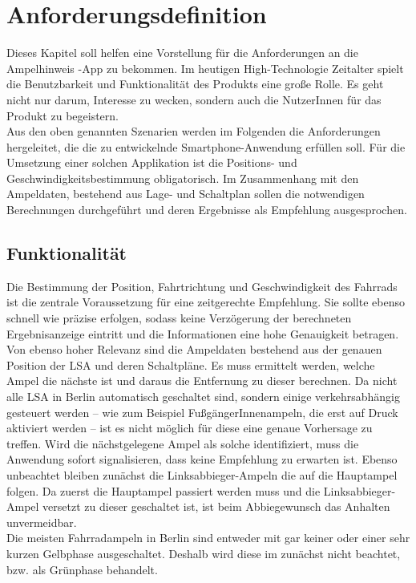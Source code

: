 \chapter{\label{chap:anforderungen}Anforderungsdefinition}
Dieses Kapitel soll helfen eine Vorstellung für die Anforderungen an die Ampelhinweis -\gls{App} zu bekommen. Im heutigen High-Technologie Zeitalter spielt die Benutzbarkeit und Funktionalität des Produkts eine große Rolle. Es geht nicht nur darum, Interesse zu wecken, sondern auch die NutzerInnen für das Produkt zu begeistern. \\
Aus den oben genannten Szenarien werden im Folgenden die Anforderungen hergeleitet, die die zu entwickelnde \gls{Smartphone}-Anwendung erfüllen soll. Für die Umsetzung einer solchen Applikation ist die Positions- und Geschwindigkeitsbestimmung obligatorisch. Im Zusammenhang mit den Ampeldaten, bestehend aus Lage- und Schaltplan sollen die notwendigen Berechnungen durchgeführt und deren Ergebnisse als Empfehlung ausgesprochen.
\section{Funktionalität}
Die Bestimmung der Position, Fahrtrichtung und Geschwindigkeit des Fahrrads ist die zentrale Voraussetzung für eine zeitgerechte Empfehlung. Sie sollte ebenso schnell wie präzise erfolgen, sodass keine Verzögerung der berechneten Ergebnisanzeige eintritt und die Informationen eine hohe Genauigkeit betragen.\\
Von ebenso hoher Relevanz sind die Ampeldaten bestehend aus der genauen Position der \gls{LSA} und deren Schaltpläne. Es muss ermittelt werden, welche Ampel die nächste ist und daraus die Entfernung zu dieser berechnen. Da nicht alle \gls{LSA} in Berlin automatisch geschaltet sind, sondern einige verkehrsabhängig gesteuert werden -- wie zum Beispiel FußgängerInnenampeln, die erst auf Druck aktiviert werden -- ist es nicht möglich für diese eine genaue Vorhersage zu treffen. Wird die nächstgelegene Ampel als solche identifiziert, muss die Anwendung sofort signalisieren, dass keine Empfehlung zu erwarten ist. Ebenso unbeachtet bleiben zunächst die Linksabbieger-Ampeln die auf die Hauptampel folgen. Da zuerst die Hauptampel passiert werden muss und die Linksabbieger-Ampel versetzt zu dieser geschaltet ist, ist beim Abbiegewunsch das Anhalten unvermeidbar.\\
Die meisten Fahrradampeln in Berlin sind entweder mit gar keiner oder einer sehr kurzen Gelbphase ausgeschaltet. Deshalb wird diese im zunächst nicht beachtet, bzw. als Grünphase behandelt.
